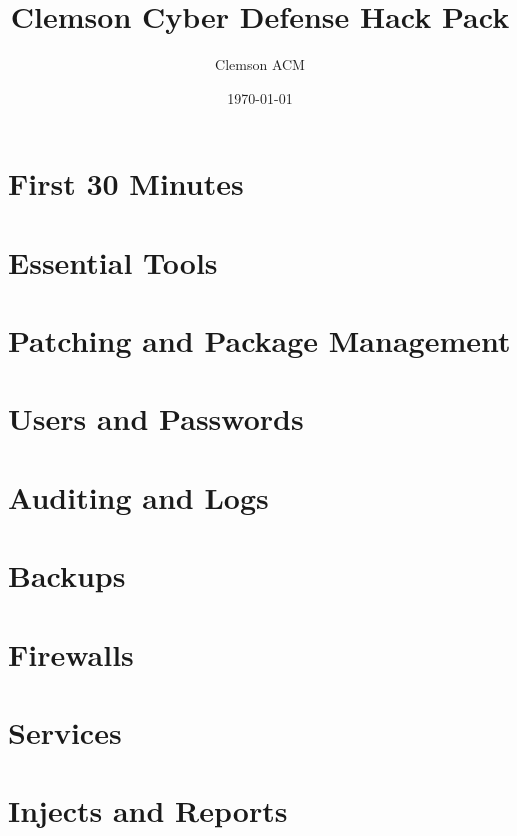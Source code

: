 \documentclass[letterpaper, 10pt]{report}
\title{Clemson Cyber Defense Hack Pack}
\author{Clemson ACM}
\date{\today}
\begin{document}
\maketitle





\tableofcontents

\chapter{First 30 Minutes}


\chapter{Essential Tools}





\chapter{Patching and Package Management}

\chapter{Users and Passwords}




\chapter{Auditing and Logs}

\chapter{Backups}

\chapter{Firewalls}



\chapter{Services}



\chapter{Injects and Reports}




\printindex


\end{document}
